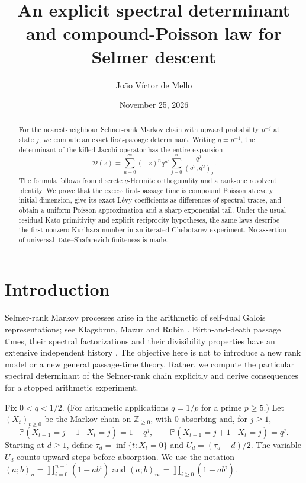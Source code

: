 \documentclass[11pt]{article}
\title{An explicit spectral determinant and compound-Poisson law for Selmer descent}
\author{Jo\~ao V\'{i}ctor de Mello}
\date{November 25, 2026}
\theoremstyle{definition}\newtheorem{definition}[theorem]{Definition}
\newcommand{\Prob}{\mathbb P}
\newcommand{\Z}{\mathbb Z}
\begin{document}
\maketitle
\begin{abstract}
For the nearest-neighbour Selmer-rank Markov chain with upward probability $p^{-j}$ at state $j$, we compute an exact first-passage determinant. Writing $q=p^{-1}$, the determinant of the killed Jacobi operator has the entire expansion
\[
 \mathcal D(z)=\sum_{n=0}^{\infty}(-z)^n q^{n^2}
             \sum_{j=0}^{n}\frac{q^j}{(q^2;q^2)_j}.
\]
The formula follows from discrete $q$-Hermite orthogonality and a rank-one resolvent identity. We prove that the excess first-passage time is compound Poisson at every initial dimension, give its exact L\'evy coefficients as differences of spectral traces, and obtain a uniform Poisson approximation and a sharp exponential tail. Under the usual residual Kato primitivity and explicit reciprocity hypotheses, the same laws describe the first nonzero Kurihara number in an iterated Chebotarev experiment. No assertion of universal Tate--Shafarevich finiteness is made.
\end{abstract}

\section{Introduction}
Selmer-rank Markov processes arise in the arithmetic of self-dual Galois representations; see Klagsbrun, Mazur and Rubin \cite{KMR}. Birth-and-death passage times, their spectral factorizations and their divisibility properties have an extensive independent history \cite{Fill,VanDoorn}. The objective here is not to introduce a new rank model or a new general passage-time theory. Rather, we compute the particular spectral determinant of the Selmer-rank chain explicitly and derive consequences for a stopped arithmetic experiment.

Fix $0<q<1/2$. (For arithmetic applications $q=1/p$ for a prime $p\geq 5$.) Let $(X_t)_{t\geq0}$ be the Markov chain on $\Z_{\geq0}$, with $0$ absorbing and, for $j\geq1$,
\begin{equation}\label{eq:chain}
 \Prob(X_{t+1}=j-1\mid X_t=j)=1-q^j,\qquad
 \Prob(X_{t+1}=j+1\mid X_t=j)=q^j.
\end{equation}
Starting at $d\geq1$, define $\tau_d=\inf\{t:X_t=0\}$ and $U_d=(\tau_d-d)/2$. The variable $U_d$ counts upward steps before absorption. We use the notation $(a;b)_n=\prod_{i=0}^{n-1}(1-ab^i)$ and $(a;b)_\infty=\prod_{i\geq0}(1-ab^i)$.
\end{document}
